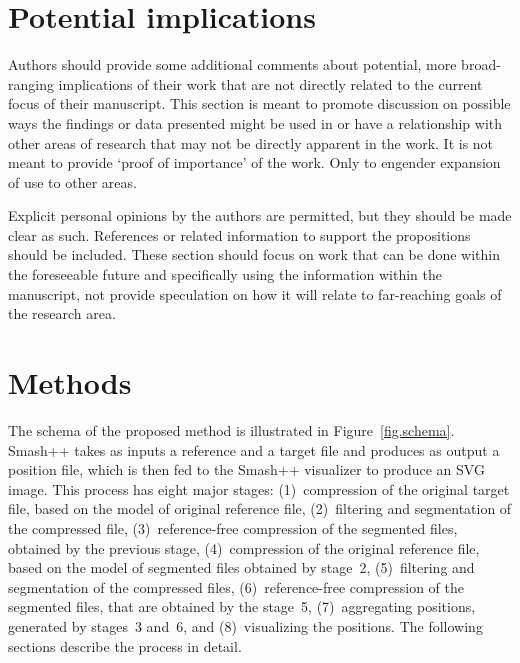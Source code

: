\documentclass[a4paper,num-refs]{oup-contemporary}
\begin{document}
\section{Potential implications}

Authors should provide some additional comments about potential, more broad-ranging implications of their work that are not directly related to the current focus of their manuscript. This section is meant to promote discussion on possible ways the findings or data presented might be used in or have a relationship with other areas of research that may not be directly apparent in the work. It is not meant to provide `proof of importance' of the work. Only to engender expansion of use to other areas. 

Explicit personal opinions by the authors are permitted, but they should be made clear as such. References or related information to support the propositions should be included. These section should focus on work that can be done within the foreseeable future and specifically using the information within the manuscript, not provide speculation on how it will relate to far-reaching goals of the research area.


\section{Methods} \label{sec.methods}
The schema of the proposed method is illustrated in Figure~\ref{fig.schema}. Smash++ takes as inputs a reference and a target file and produces as output a position file, which is then fed to the Smash++ visualizer to produce an SVG image. This process has eight major stages: (1)~compression of the original target file, based on the model of original reference file, (2)~filtering and segmentation of the compressed file, (3)~reference-free compression of the segmented files, obtained by the previous stage, (4)~compression of the original reference file, based on the model of segmented files obtained by stage~2, (5)~filtering and segmentation of the compressed files, (6)~reference-free compression of the segmented files, that are obtained by the stage~5, (7)~aggregating positions, generated by stages~3 and~6, and (8)~visualizing the positions. The following sections describe the process in detail.
\end{document}

